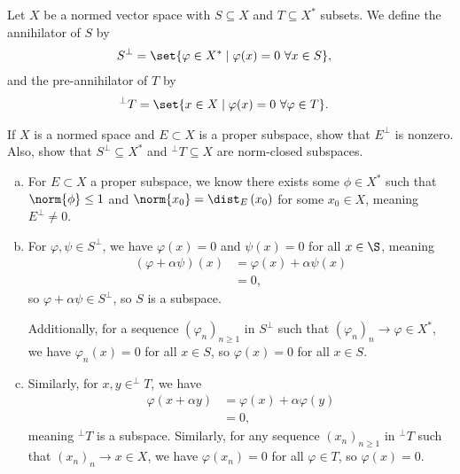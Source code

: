 \documentclass[10pt]{mypackage}
\begin{document}
  \begin{definition}
    Let $X$ be a normed vector space with $S\subseteq X$ and $T\subseteq X^{\ast}$ subsets. We define the annihilator of $S$ by
    \begin{align*}
      S^{\perp} &= \set{\varphi\in X^{\ast}\mid \varphi(x)= 0~\forall x\in S},
    \end{align*}
    and the pre-annihilator of $T$ by
    \begin{align*}
      ^{\perp}T &= \set{x\in X\mid \varphi(x) = 0~\forall \varphi \in T}.
    \end{align*}
  \end{definition}
  \begin{exercise}
    If $X$ is a normed space and $E\subset X$ is a proper subspace, show that $E^{\perp}$ is nonzero. Also, show that $S^{\perp}\subseteq X^{\ast}$ and $^{\perp}T\subseteq X$ are norm-closed subspaces.
  \end{exercise}
  \begin{solution}\hfill
    \begin{enumerate}[(a)]
      \item For $E\subset X$ a proper subspace, we know there exists some $\phi\in X^{\ast}$ such that $\norm{\phi} \leq 1$ and $\norm{x_0} = \dist_{E}\left(x_0\right)$ for some $x_0\in X$, meaning $E^{\perp}\neq 0$.
      \item For $\varphi,\psi\in S^{\perp}$, we have $\varphi(x) = 0$ and $\psi(x) = 0$ for all $x\in \S$, meaning
        \begin{align*}
          \left(\varphi + \alpha \psi\right)\left(x\right) &= \varphi(x) + \alpha \psi(x)\\
                                                           &= 0,
        \end{align*}
        so $\varphi + \alpha \psi\in S^{\perp}$, so $S$ is a subspace.\newline

        Additionally, for a sequence $\left(\varphi_n\right)_{n\geq 1} $ in $S^{\perp}$ such that $\left(\varphi_{n}\right)_n\rightarrow \varphi\in X^{\ast}$, we have $\varphi_n(x) = 0$ for all $x\in S$, so $\varphi(x) = 0$ for all $x\in S$.
      \item Similarly, for $x,y\in ^{\perp}T$, we have
        \begin{align*}
          \varphi\left(x + \alpha y\right) &= \varphi(x) + \alpha\varphi(y)\\
                                           &= 0,
        \end{align*}
        meaning $^{\perp}T$ is a subspace. Similarly, for any sequence $\left(x_n\right)_{n\geq 1}$ in $^{\perp}T$ such that $\left(x_n\right)_n\rightarrow x\in X$, we have $\varphi\left(x_n\right) = 0$ for all $\varphi \in T$, so $\varphi(x) = 0$.
    \end{enumerate}
  \end{solution}
\end{document}
